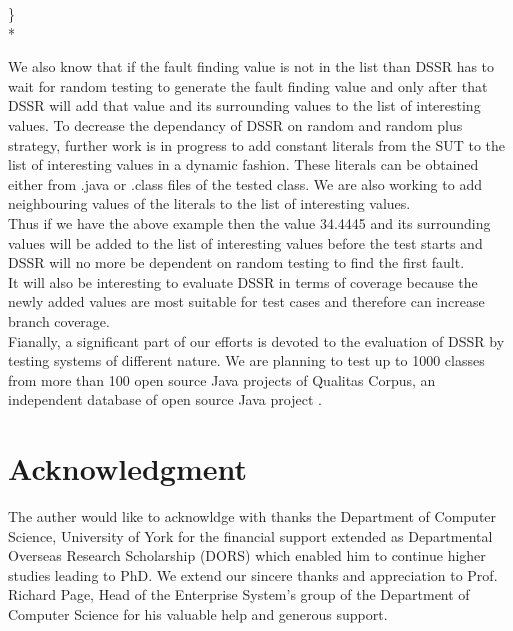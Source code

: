 \documentclass[10pt, conference, compsocconf]{IEEEtran}
\begin{document}
\} \\*


We also know that if the fault finding value is not in the list than DSSR has to wait for random testing to generate the fault finding value and only after that DSSR will add that value and its surrounding values to the list of interesting values. To decrease the dependancy of DSSR on random and random plus strategy, further work is in progress to add constant literals from the SUT to the list of interesting values in a dynamic fashion. These literals can be obtained either from .java or .class files of the tested class. We are also working to add  neighbouring values of the literals to the list of interesting values. \\

Thus if we have the above example then the value 34.4445 and its surrounding values will be added to the list of interesting values before the test starts and DSSR will no more be dependent on random testing to find the first fault.\\

It will also be interesting to evaluate DSSR in terms of coverage because the newly added values are most suitable for test cases and therefore can increase branch coverage. \\

Fianally, a significant part of our efforts is devoted to the evaluation of DSSR by testing systems of different nature. We are planning to test up to 1000 classes from more than 100 open source Java projects of Qualitas Corpus, an independent database of open source Java project \cite{Tempero2010}. \\



\section*{Acknowledgment}
The auther would like to acknowldge with thanks the Department of Computer Science, University of York for the financial support extended as Departmental Overseas Research Scholarship (DORS) which enabled him to continue higher studies leading to PhD. We extend our sincere thanks and appreciation to Prof. Richard Page, Head of the Enterprise System's group of the Department of Computer Science for his valuable help and generous support.\\







%
%
%

\end{document}
